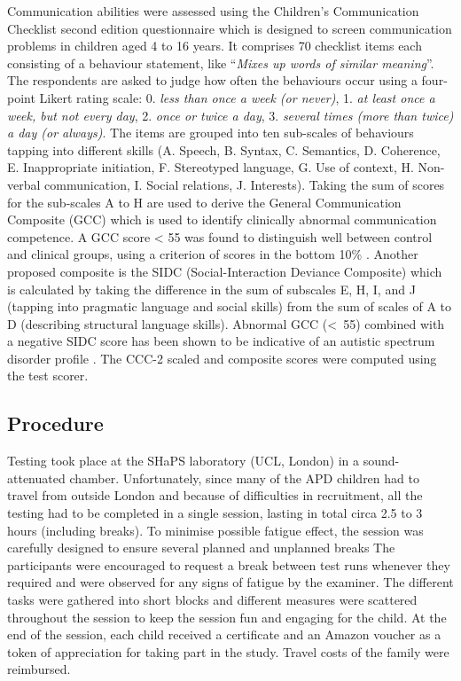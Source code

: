\documentclass[a4paper, twoside]{templates/ociamthesis}
\begin{document}
\hfill\break
Communication abilities were assessed using the Children's Communication Checklist second edition questionnaire \autocite[CCC-2;][]{Bishop2003} which is designed to screen communication problems in children aged 4 to 16 years. It comprises 70 checklist items each consisting of a behaviour statement, like ``\emph{Mixes up words of similar meaning}''. The respondents are asked to judge how often the behaviours occur using a four-point Likert rating scale: 0. \emph{less than once a week (or never)}, 1. \emph{at least once a week, but not every day}, 2. \emph{once or twice a day}, 3. \emph{several times (more than twice) a day (or always)}. The items are grouped into ten sub-scales of behaviours tapping into different skills (A. Speech, B. Syntax, C. Semantics, D. Coherence, E. Inappropriate initiation, F. Stereotyped language, G. Use of context, H. Non-verbal communication, I. Social relations, J. Interests). Taking the sum of scores for the sub-scales A to H are used to derive the General Communication Composite (GCC) which is used to identify clinically abnormal communication competence. A GCC score \textless{} 55 was found to distinguish well between control and clinical groups, using a criterion of scores in the bottom 10\% \autocite{Norbury2005}. Another proposed composite is the SIDC (Social-Interaction Deviance Composite) which is calculated by taking the difference in the sum of subscales E, H, I, and J (tapping into pragmatic language and social skills) from the sum of scales of A to D (describing structural language skills). Abnormal GCC (\textless~55) combined with a negative SIDC score has been shown to be indicative of an autistic spectrum disorder profile \autocite{Bishop2003}. The CCC-2 scaled and composite scores were computed using the test scorer.\\

\hypertarget{procedure-3}{%
\subsection{Procedure}\label{procedure-3}}

Testing took place at the SHaPS laboratory (UCL, London) in a sound-attenuated chamber. Unfortunately, since many of the APD children had to travel from outside London and because of difficulties in recruitment, all the testing had to be completed in a single session, lasting in total circa 2.5 to 3 hours (including breaks). To minimise possible fatigue effect, the session was carefully designed to ensure several planned and unplanned breaks The participants were encouraged to request a break between test runs whenever they required and were observed for any signs of fatigue by the examiner. The different tasks were gathered into short blocks and different measures were scattered throughout the session to keep the session fun and engaging for the child. At the end of the session, each child received a certificate and an Amazon voucher as a token of appreciation for taking part in the study. Travel costs of the family were reimbursed.\\
\end{document}
